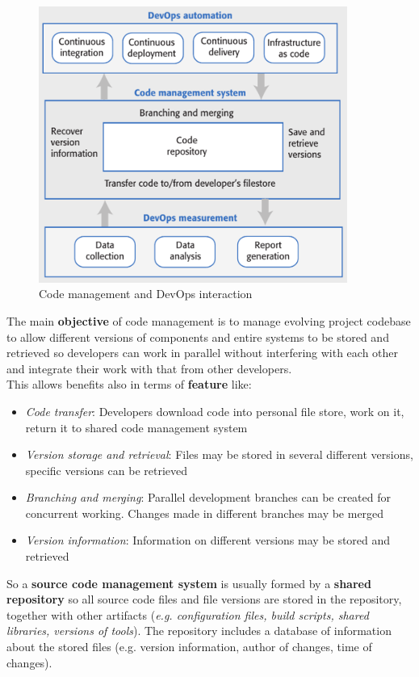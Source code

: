 \documentclass[10pt,a4paper]{report}
\begin{document}
\begin{figure}[h]
	\centering
	\includegraphics[width=0.9\textwidth]{image97}
	\caption{Code management and DevOps interaction}
	\label{image97}
\end{figure} 
The main \textbf{objective} of code management is to manage evolving project codebase to allow different versions of components and entire systems to be stored and retrieved so developers can work in parallel without interfering with each other and integrate their work with that from other developers.\\
This allows benefits also in terms of \textbf{feature} like:
\begin{itemize}
	\item \textit{Code transfer}: Developers download code into personal file store, work on it, return it to shared code management system
	\item \textit{Version storage and retrieval}: Files may be stored in several different versions, specific versions can be retrieved
	\item \textit{Branching and merging}: Parallel development branches can be created for concurrent working. Changes made in different branches may be merged
	\item \textit{Version information}: Information on different versions may be stored and retrieved
	
\end{itemize}
So a \textbf{source code management system} is usually formed by a \textbf{shared repository} so all source code  files and file versions are stored in the repository, together with other artifacts (\textit{e.g. configuration files, build scripts, shared libraries, versions of tools}). The repository includes a database of information about the stored files (e.g. version information, author of changes, time of changes).
\end{document}
